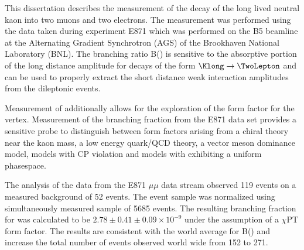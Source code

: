 %
This dissertation describes the measurement of the decay of the long lived neutral kaon into two muons and two electrons.  The measurement was performed using the data taken during experiment E871 which was performed on the B5 beamline at the Alternating Gradient Synchrotron (AGS) of the Brookhaven National Laboratory (BNL).  The branching ratio B(\KtoMuMuEE) is sensitive to the absorptive portion of the long distance amplitude for decays of the form $\Klong \rightarrow \TwoLepton$ and can be used to properly extract the short distance weak interaction amplitudes from the dileptonic events.

Measurement of \KtoMuMuEE additionally allows for the exploration of the form factor for the \Kgamstargamstar vertex.  Measurement of the \KtoMuMuEE branching fraction from the E871 data set provides a sensitive probe to distinguish between form factors arising from a chiral theory near the kaon mass, a low energy quark/QCD theory, a vector meson dominance model, models with CP violation and models with exhibiting a uniform phasespace.

The analysis of the data from the E871 $\mu\mu$ data stream observed 119 \KtoMuMuEE events on a measured background of 52 events.  The \KtoMuMuEE event sample was normalized using simultaneously measured sample of 5685 \KtoMuMu events.  The resulting branching fraction for \KtoMuMuEE was calculated to be $2.78\pm0.41\pm0.09\times 10^{-9}$ under the assumption of a $\chi$PT form factor.  The results are consistent with the world average for B(\KtoMuMuEE) and increase the total number of \KtoMuMuEE events observed world wide from 152 to 271. 



